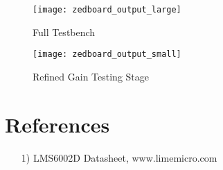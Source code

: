 \begin{figure}[H]
	\centerline{\texttt{[image: zedboard\_output\_large]}}
	\caption{Full Testbench}
\end{figure}

\begin{figure}[H]
	\centerline{\texttt{[image: zedboard\_output\_small]}}
	\caption{Refined Gain Testing Stage}
\end{figure}

\section*{References}
\begin{flushleft}
	\begin{itemize}
		\item[1)] LMS6002D Datasheet, www.limemicro.com
	\end{itemize}
\end{flushleft}


